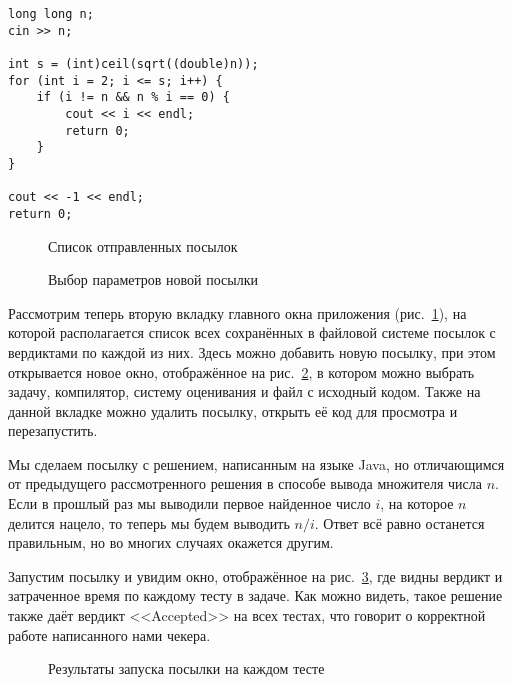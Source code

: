 {\small
\begin{verbatim}
long long n;
cin >> n;

int s = (int)ceil(sqrt((double)n));
for (int i = 2; i <= s; i++) {
    if (i != n && n % i == 0) {
        cout << i << endl;
        return 0;
    }
}

cout << -1 << endl;
return 0;
\end{verbatim}
}

\begin{figure}[!b]
\caption{Список отправленных посылок}
\label{screen_submissions}
\end{figure}

\begin{figure}[!b]
\caption{Выбор параметров новой посылки}
\label{screen_new_submission}
\end{figure}

Рассмотрим теперь вторую вкладку главного окна приложения (рис.~\ref{screen_submissions}), на которой располагается список всех сохранённых в файловой системе посылок с вердиктами по каждой из них. Здесь можно добавить новую посылку, при этом открывается новое окно, отображённое на рис.~\ref{screen_new_submission}, в котором можно выбрать задачу, компилятор, систему оценивания и файл с исходный кодом. Также на данной вкладке можно удалить посылку, открыть её код для просмотра и перезапустить.

Мы сделаем посылку с решением, написанным на языке Java, но отличающимся от предыдущего рассмотренного решения в способе вывода множителя числа $n$. Если в прошлый раз мы выводили первое найденное число $i$, на которое $n$ делится нацело, то теперь мы будем выводить $n/i$. Ответ всё равно останется правильным, но во многих случаях окажется другим.

Запустим посылку и увидим окно, отображённое на рис.~\ref{screen_submission_results}, где видны вердикт и затраченное время по каждому тесту в задаче. Как можно видеть, такое решение также даёт вердикт <<Accepted>> на всех тестах, что говорит о корректной работе написанного нами чекера.

\begin{figure}[h]
\caption{Результаты запуска посылки на каждом тесте}
\label{screen_submission_results}
\end{figure}